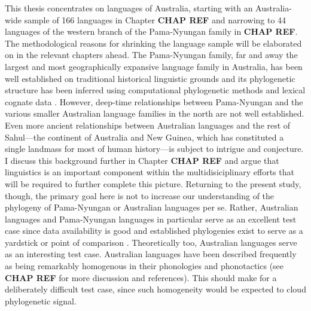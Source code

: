This thesis concentrates on languages of Australia, starting with an Australia-wide sample of 166 languages in Chapter \textbf{CHAP REF} and narrowing to 44 languages of the western branch of the Pama-Nyungan family in \textbf{CHAP REF}. The methodological reasons for shrinking the language sample will be elaborated on in the relevant chapters ahead. The Pama-Nyungan family, far and away the largest and most geographically expansive language family in Australia, has been well established on traditional historical linguistic grounds and its phylogenetic structure has been inferred using computational phylogenetic methods and lexical cognate data \autocites{bowern_computational_2012}{bouckaert_origin_2018}. However, deep-time relationships between Pama-Nyungan and the various smaller Australian language families in the north are not well established. Even more ancient relationships between Australian languages and the rest of Sahul---the continent of Australia and New Guinea, which has constituted a single landmass for most of human history---is subject to intrigue and conjecture. I discuss this background further in Chapter \textbf{CHAP REF} and argue that linguistics is an important component within the multidisiciplinary efforts that will be required to further complete this picture. Returning to the present study, though, the primary goal here is not to increase our understanding of the phylogeny of Pama-Nyungan or Australian languages per se. Rather, Australian languages and Pama-Nyungan languages in particular serve as an excellent test case since data availability is good \autocites[lexical data in][]{bowern_chirila_2016}{round_ausphon_2017} and established phylogenies exist to serve as a yardstick or point of comparison \autocites{bowern_computational_2012}{bouckaert_origin_2018}. Theoretically too, Australian languages serve as an interesting test case. Australian languages have been described frequently as being remarkably homogenous in their phonologies and phonotactics \autocites{round_segment_2021}{round_phonotactics_2021} (see \textbf{CHAP REF} for more discussion and references). This should make for a deliberately difficult test case, since such homogeneity would be expected to cloud phylogenetic signal.

